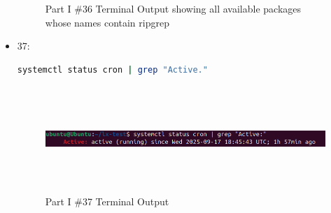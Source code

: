 \begin{itemize}
\begin{figure}[htp]
    \caption{Part I \#36 Terminal Output showing all available packages whose names contain ripgrep}
    \label{fig:part I 36}
\end{figure}
    \item 37: 
    \begin{lstlisting}[language=Bash]
        systemctl status cron | grep "Active."
    \end{lstlisting}
    \begin{figure}[htp]
    \centering
    \includegraphics[width=16cm, height=4cm]{png/LinuxProblemSetPicsPNG/part_i_37.png}
    \caption{Part I \#37 Terminal Output}
    \label{fig:part I 37}
\end{figure}
\end{itemize}

